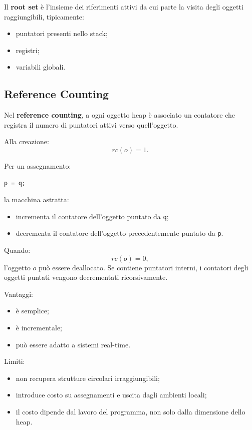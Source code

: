 \documentclass{article}
\begin{document}
Il \textbf{root set} è l'insieme dei riferimenti attivi da cui parte la visita degli oggetti raggiungibili, tipicamente:
\begin{itemize}
  \item puntatori presenti nello stack;
  \item registri;
  \item variabili globali.
\end{itemize}

\subsection{Reference Counting}

Nel \textbf{reference counting}, a ogni oggetto heap è associato un contatore che registra il numero di puntatori attivi verso quell'oggetto.

Alla creazione:
\[
rc(o) = 1.
\]

Per un assegnamento:

\begin{lstlisting}
p = q;
\end{lstlisting}

la macchina astratta:
\begin{itemize}
  \item incrementa il contatore dell'oggetto puntato da \texttt{q};
  \item decrementa il contatore dell'oggetto precedentemente puntato da \texttt{p}.
\end{itemize}

Quando:
\[
rc(o)=0,
\]
l'oggetto $o$ può essere deallocato. Se contiene puntatori interni, i contatori degli oggetti puntati vengono decrementati ricorsivamente.

Vantaggi:
\begin{itemize}
  \item è semplice;
  \item è incrementale;
  \item può essere adatto a sistemi real-time.
\end{itemize}

Limiti:
\begin{itemize}
  \item non recupera strutture circolari irraggiungibili;
  \item introduce costo su assegnamenti e uscita dagli ambienti locali;
  \item il costo dipende dal lavoro del programma, non solo dalla dimensione dello heap.
\end{itemize}
\end{document}
